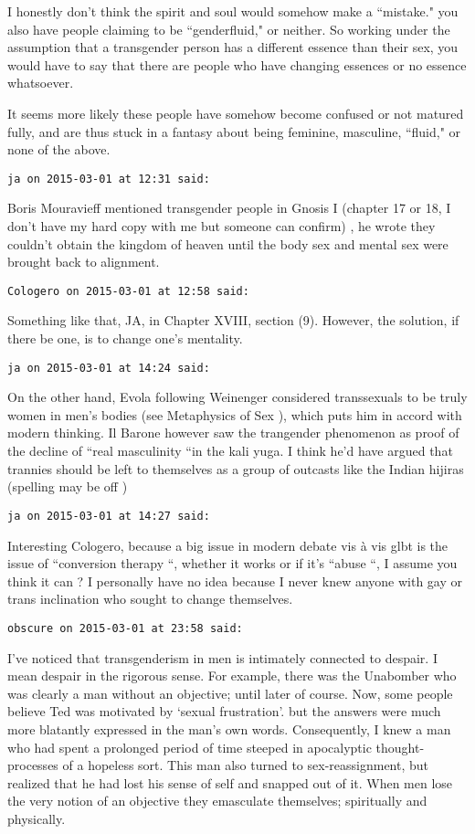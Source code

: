 \begin{footnotesize}
\begin{sffamily}
I honestly don't think the spirit and soul would somehow make a ``mistake." you also have people claiming to be ``genderfluid," or neither. So working under the assumption that a transgender person has a different essence than their sex, you would have to say that there are people who have changing essences or no essence whatsoever. 

It seems more likely these people have somehow become confused or not matured fully, and are thus stuck in a fantasy about being feminine, masculine, ``fluid," or none of the above.


\hfill

\texttt{ja on 2015-03-01 at 12:31 said: }

Boris Mouravieff mentioned transgender people in Gnosis I (chapter 17 or 18, I don't have my hard copy with me but someone can confirm) , he wrote they couldn't obtain the kingdom of heaven until the body sex and mental sex were brought back to alignment.


\hfill

\texttt{Cologero on 2015-03-01 at 12:58 said: }

Something like that, JA, in Chapter XVIII, section (9). However, the solution, if there be one, is to change one's mentality.


\hfill

\texttt{ja on 2015-03-01 at 14:24 said: }

On the other hand, Evola following Weinenger considered transsexuals to be truly women in men's bodies (see Metaphysics of Sex ), which puts him in accord with modern thinking. Il Barone however saw the trangender phenomenon as proof of the decline of ``real masculinity ``in the kali yuga. I think he'd have argued that trannies should be left to themselves as a group of outcasts like the Indian hijiras (spelling may be off )


\hfill

\texttt{ja on 2015-03-01 at 14:27 said: }

Interesting Cologero, because a big issue in modern debate vis à vis glbt is the issue of ``conversion therapy ``, whether it works or if it's ``abuse ``, I assume you think it can ? I personally have no idea because I never knew anyone with gay or trans inclination who sought to change themselves.


\hfill

\texttt{obscure on 2015-03-01 at 23:58 said: }

I've noticed that transgenderism in men is intimately connected to despair. I mean despair in the rigorous sense. For example, there was the Unabomber who was clearly a man without an objective; until later of course. Now, some people believe Ted was motivated by `sexual frustration'. but the answers were much more blatantly expressed in the man's own words. Consequently, I knew a man who had spent a prolonged period of time steeped in apocalyptic thought-processes of a hopeless sort. This man also turned to sex-reassignment, but realized that he had lost his sense of self and snapped out of it. When men lose the very notion of an objective they emasculate themselves; spiritually and physically.


\end{sffamily}
\end{footnotesize}
